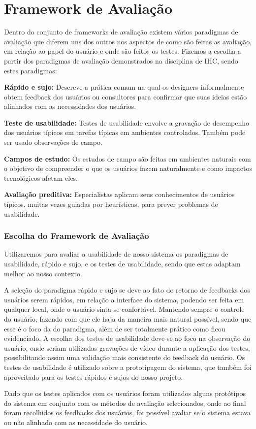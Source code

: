 \chapter[Framework de Avaliação]{Framework de Avaliação}

Dentro do conjunto de frameworks de avaliação existem vários paradigmas de avaliação que diferem uns dos outros nos aspectos de como são feitas as avaliação, em relação ao papel do usuário e onde são feitos os testes.
Fizemos a escolha a partir dos paradigmas de avaliação demonstrados na disciplina de IHC, sendo estes paradigmas:

\hspace{1.3cm}
\textbf{Rápido e sujo:} Descreve a prática comum na qual os designers informalmente obtem feedback dos usuários ou consultores para confirmar que suas ideias estão alinhados com as necessidades dos usuários.

\hspace{1.3cm}
\textbf{Teste de usabilidade:} Testes de usabilidade envolve a gravação de desempenho dos usuários típicos em tarefas típicas em ambientes controlados. Também pode ser usado observações de campo.

\hspace{1.3cm}
\textbf{Campos de estudo:} Os estudos de campo são feitas em ambientes naturais com o objetivo de compreender o que os usuários fazem naturalmente e como impactos tecnológicos afetam eles.

\hspace{1.3cm}
\textbf{Avaliação preditiva:} Especialistas aplicam seus conhecimentos de usuários típicos, muitas vezes guiadas por heurísticas, para prever problemas de usabilidade.


\subsection{Escolha do Framework de Avaliação}

Utilizaremos para avaliar a usabilidade de nosso sistema os paradigmas de usabilidade, rápido e sujo, e os testes de usabilidade, sendo que estas adaptam melhor ao nosso contexto.

A seleção do paradigma rápido e sujo se deve ao fato do retorno de feedbacks dos usuários serem rápidos, em relação a interface do sistema, podendo ser feita em qualquer local, onde o usuário sinta-se confortável. Mantendo sempre o controle do usuário, fazendo com que ele haja da maneira mais natural possível, sendo que esse é o foco da do paradigma, além de ser totalmente prático como ficou evidenciado. A escolha dos testes de usabilidade deve-se ao foco na observação do usuário, onde seriam utilizadas gravações de vídeo durante a aplicação dos testes, possibilitando assim uma validação mais consistente do feedback do usuário. Os testes de usabilidade é utilizado sobre a prototipagem do sistema, que também foi aproveitado para os testes rápidos e sujos do nosso projeto.

Dado que os testes aplicados com os usuários foram utilizados alguns protótipos do sistema em conjunto com os métodos de avaliação selecionados, onde ao final foram recolhidos os feedbacks dos usuários, foi possível avaliar se o sistema estava ou não alinhado com as necessidade do usuário.
